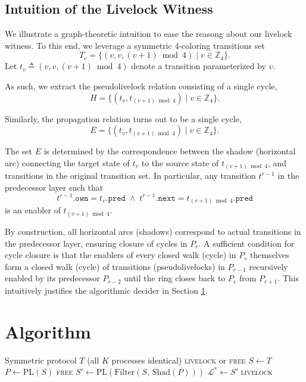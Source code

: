 \documentclass{article}
\newcommand{\Ls}{\mathcal{L}^{*}}
\newcommand{\PL}{\mathrm{PL}}
\newcommand{\Shad}{\mathrm{Shad}}
\newcommand{\Filter}{\mathrm{Filter}}
\begin{document}
\subsection{Intuition of the Livelock Witness}

We illustrate a graph-theoretic intuition to ease the reasong about our livelock witness. To this end, we leverage a symmetric $4$-coloring transitions set 
\[
T_c = \{ (v, v, (v + 1) \bmod 4) \mid v \in \mathbb{Z}_4 \}.
\]
Let $t_v \triangleq (v, v, (v + 1) \bmod 4)$ denote a transition parameterized by $v$.

As such, we extract the pseudolivelock relation consisting of a single cycle,
\[
H = \{ (t_v, t_{(v + 1) \bmod 4}) \mid v \in \mathbb{Z}_4 \}.
\]

Similarly, the propagation relation turns out to be a single cycle,
\[
E = \{ (t_v, t_{(v + 1) \bmod 4}) \mid v \in \mathbb{Z}_4 \}.
\]

The set $E$ is determined by the correspondence between the shadow (horizontal arc) connecting the target state of $t_v$ to the source state of $t_{(v + 1) \bmod 4}$, and transitions in the original transition set. In particular, any transition $t^{r-1}$ in the predecessor layer such that
\[
t^{r-1}.\mathtt{own} = t_v.\mathtt{pred}
\;\wedge\;
t^{r-1}.\mathtt{next} = t_{(v+1) \bmod 4}.\mathtt{pred}
\]
is an enabler of $t_{(v + 1) \bmod 4}$.

By construction, all horizontal arcs (shadows) correspond to actual transitions in the predecessor layer, ensuring closure of cycles in $P_r$. A sufficient condition for cycle closure is that the enablers of every closed walk (cycle) in $P_r$ themselves form a closed walk (cycle) of transitions (pseudolivelocks) in $P_{r-1}$ recursively enabled by its predecessor $P_{r-2}$ until the ring closes back to $P_r$ from $P_{r+1}$. This intuitively justifies the algorithmic decider in Section \ref{sec:algorithm}.

   
\section{Algorithm}
\label{sec:algorithm}

\begin{algorithm}[h]
\caption{Algorithm~1: Symmetric livelock decision}
\label{alg:main}
\begin{algorithmic}[1]
\Require Symmetric protocol $T$ (all $K$ processes identical)
\Ensure \textsc{livelock} or \textsc{free}
\State $S \leftarrow T$
\Repeat
  \State $P \leftarrow \PL(S)$
    \hfill{}
   \Return \textsc{free} \EndIf
  \State $S' \leftarrow \PL(\Filter(S,\,\Shad(P)))$
    \hfill{}
\State $\Ls \leftarrow S'$
\Return \textsc{livelock}
\end{algorithmic}
\end{algorithm}
\end{document}
